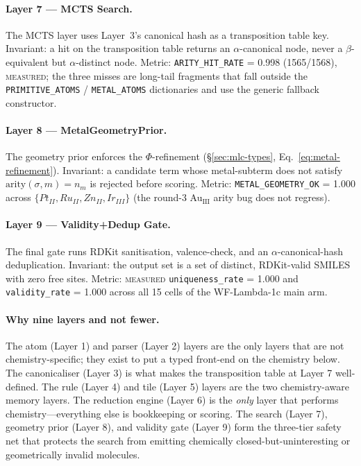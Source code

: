 \paragraph{Layer 7 --- MCTS Search.}
The MCTS layer uses Layer~3's canonical hash as a transposition
table key. Invariant: a hit on the transposition table returns
an $\alpha$-canonical node, never a $\beta$-equivalent but
$\alpha$-distinct node. Metric: \texttt{ARITY\_HIT\_RATE} =
0.998 (1565/1568), \textsc{measured}; the three misses are
long-tail fragments that fall outside the \texttt{PRIMITIVE\_ATOMS}
/ \texttt{METAL\_ATOMS} dictionaries and use the generic
fallback constructor.

\paragraph{Layer 8 --- MetalGeometryPrior.}
The geometry prior enforces the $\Phi$-refinement
(\S\ref{sec:mlc-types}, Eq.~\eqref{eq:metal-refinement}).
Invariant: a candidate term whose metal-subterm does not satisfy
$\mathrm{arity}(\sigma, m) = n_m$ is rejected before scoring.
Metric: \texttt{METAL\_GEOMETRY\_OK} = 1.000 across
$\{Pt_{II}, Ru_{II}, Zn_{II}, Ir_{III}\}$ (the round-3
Au$_{\text{III}}$ arity bug does not regress).

\paragraph{Layer 9 --- Validity+Dedup Gate.}
The final gate runs RDKit sanitisation, valence-check, and an
$\alpha$-canonical-hash deduplication. Invariant: the output set
is a set of distinct, RDKit-valid SMILES with zero free sites.
Metric: \textsc{measured} \texttt{uniqueness\_rate} = 1.000 and
\texttt{validity\_rate} = 1.000 across all 15 cells of the
WF-Lambda-1c main arm.

\paragraph{Why nine layers and not fewer.}
The atom (Layer 1) and parser (Layer 2) layers are the only
layers that are not chemistry-specific; they exist to put a typed
front-end on the chemistry below.
The canonicaliser (Layer 3) is what makes the transposition
table at Layer 7 well-defined.
The rule (Layer 4) and tile (Layer 5) layers are the two
chemistry-aware memory layers.
The reduction engine (Layer 6) is the \emph{only} layer that
performs chemistry---everything else is bookkeeping or scoring.
The search (Layer 7), geometry prior (Layer 8), and validity
gate (Layer 9) form the three-tier safety net that protects the
search from emitting chemically closed-but-uninteresting or
geometrically invalid molecules.

